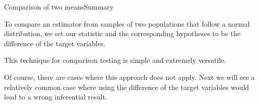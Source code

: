 %
%

\begin{frame}{Comparison of two means}{Summary}

  To compare an estimator from samples of two populations that follow a normal distribution, we set our statistic and the corresponding hypotheses to be the difference of the target variables.\bigskip

  This technique for comparison testing is simple and extremely versatile.\bigskip

  Of course, there are cases where this approach does not apply. Next we will see a relatively common case where using the difference of the target variables would lead to a wrong inferential result.
\end{frame}
